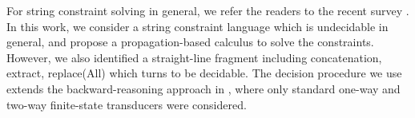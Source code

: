 
For string constraint solving in general, we refer the readers to the recent survey \cite{Ama20}. In this work, we consider a string constraint language which is undecidable in general, and propose a propagation-based calculus to solve the constraints. However, we also identified a straight-line fragment including concatenation, extract, replace(All) which turns to be decidable. The decision procedure we use extends the backward-reasoning approach in \cite{CHL+19}, where only standard one-way and two-way finite-state transducers were considered. 
